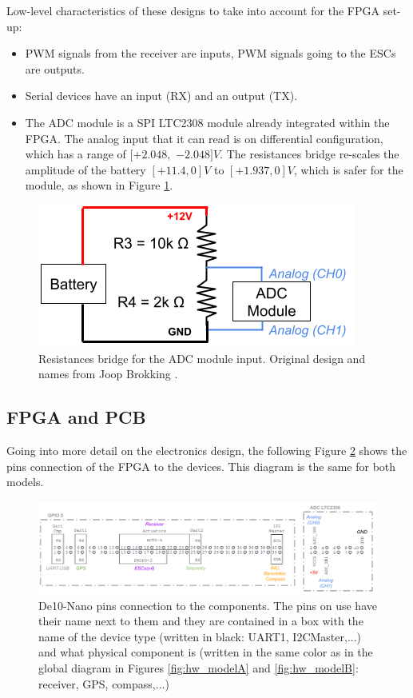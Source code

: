 Low-level characteristics of these designs to take into account for the FPGA set-up:
\begin{itemize}
    \item PWM signals from the receiver are inputs, PWM signals going to the ESCs are outputs.
    \item Serial devices have an input (RX) and an output (TX).
    \item The ADC module is a SPI LTC2308 module already integrated within the FPGA. The analog input that it can read is on differential configuration, which has a range of $[+2.048,$ $-2.048]V$. The resistances bridge re-scales the amplitude of the battery $[+11.4,0]V$ to $[+1.937,0]V$, which is safer for the module, as shown in Figure \ref{fig:hw_adc}.
\end{itemize}

\begin{figure}[H]
    \centering
    \includegraphics[scale=0.45]{Figures/hardware/resistances_bridge.png}
    \caption{Resistances bridge for the ADC module input. Original design and names from Joop Brokking \cite{bib:brooking}.}
    \label{fig:hw_adc}
\end{figure}

\subsection{FPGA and PCB}

Going into more detail on the electronics design, the following Figure \ref{fig:hw_pins} shows the pins connection of the FPGA to the devices. This diagram is the same for both models.

\begin{figure}[!ht]
    \centering
    \includegraphics[width=\textwidth]{Figures/hardware/FPGA_pins_ADC.png}
    \caption{De10-Nano pins connection to the components. The pins on use have their name next to them and they are contained in a box with the name of the device type (written in black: UART1, I2CMaster,...) and what physical component is (written in the same color as in the global diagram in Figures \ref{fig:hw_modelA} and \ref{fig:hw_modelB}: receiver, GPS, compass,...)}
    \label{fig:hw_pins}
\end{figure}

